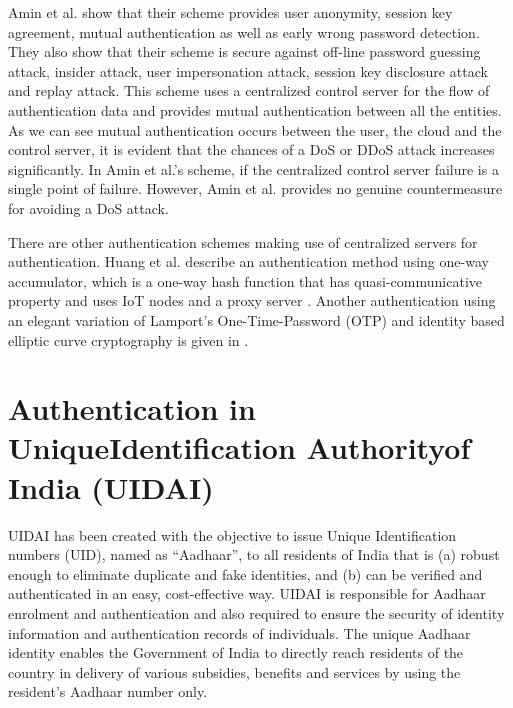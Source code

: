 \bigskip
\medskip

\begin{multicols}{2}
Amin et al. show that their scheme provides user anonymity, session key agreement, mutual authentication as well as early wrong password detection. They also show that their scheme is secure against off-line password guessing attack, insider attack, user impersonation attack, session key disclosure attack and replay attack. This scheme uses a centralized control server for the flow of authentication data and provides mutual authentication between all the entities. As we can see mutual authentication occurs between the user, the cloud and the control server, it is evident that the chances of a DoS or DDoS attack increases significantly. In Amin et al.'s scheme, if the centralized control server failure is a single point of failure. However, Amin et al. provides no genuine countermeasure for avoiding a DoS attack.

There are other authentication schemes making use of centralized servers for authentication. Huang et al. describe an authentication method using one-way accumulator, which is a one-way hash function that has quasi-communicative property and uses IoT nodes and a proxy server \cite{chap2-key22}. Another authentication using an elegant variation of Lamport's One-Time-Password (OTP) and identity based elliptic curve cryptography is given in \cite{chap2-key22}.

\section{Authentication in Unique\hfill\break Identification Authority\hfill\break of India (UIDAI)}

UIDAI has been created with the objective to issue Unique Identification numbers (UID), named as ``Aadhaar'', to all residents of India that is (a) robust enough to eliminate duplicate and fake identities, and (b) can be verified and authenticated in an easy, cost-effective way. UIDAI is responsible for Aadhaar enrolment and authentication and also required to ensure the security of identity information and authentication records of individuals. The unique Aadhaar identity enables the Government of India to directly reach residents of the country in delivery of various subsidies, benefits and services by using the resident's Aadhaar number only.
 

\end{multicols}
